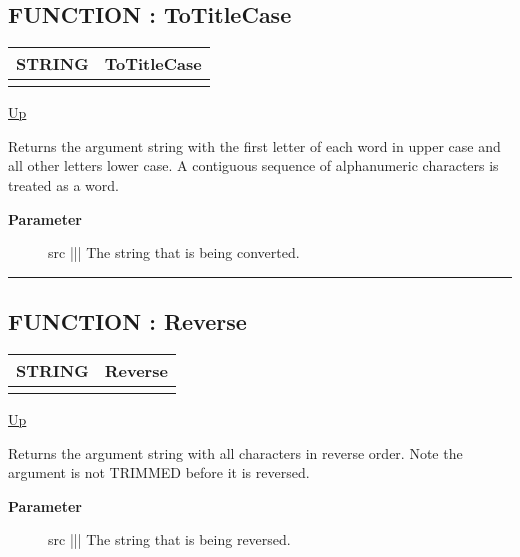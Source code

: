\subsection*{FUNCTION : ToTitleCase}
\hypertarget{ecldoc:str.totitlecase}{}

{\renewcommand{\arraystretch}{1.5}
\begin{tabularx}{\textwidth}{|>{\raggedright\arraybackslash}l|X|}
\hline
\hspace{0pt}STRING & ToTitleCase \\
\hline
\multicolumn{2}{|>{\raggedright\arraybackslash}X|}{\hspace{0pt}(STRING src)} \\
\hline
\end{tabularx}
}

\hyperlink{ecldoc:Str}{Up}

\par
Returns the argument string with the first letter of each word in upper case and all other letters lower case. A contiguous sequence of alphanumeric characters is treated as a word.

\par
\begin{description}
\item [\textbf{Parameter}] src ||| The string that is being converted.
\end{description}

\rule{\textwidth}{0.4pt}
\subsection*{FUNCTION : Reverse}
\hypertarget{ecldoc:str.reverse}{}

{\renewcommand{\arraystretch}{1.5}
\begin{tabularx}{\textwidth}{|>{\raggedright\arraybackslash}l|X|}
\hline
\hspace{0pt}STRING & Reverse \\
\hline
\multicolumn{2}{|>{\raggedright\arraybackslash}X|}{\hspace{0pt}(STRING src)} \\
\hline
\end{tabularx}
}

\hyperlink{ecldoc:Str}{Up}

\par
Returns the argument string with all characters in reverse order. Note the argument is not TRIMMED before it is reversed.

\par
\begin{description}
\item [\textbf{Parameter}] src ||| The string that is being reversed.
\end{description}

